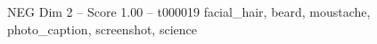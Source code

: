 \begin{textsample}{NEG Dim 2 – Score 1.00 – t000019}  \label{ex:f2_neg_022}
facial\_hair, beard, moustache, photo\_caption, screenshot, science

\end{textsample}
